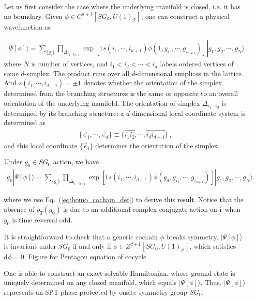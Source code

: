 \documentclass[%
 reprint,
 amsmath,amssymb,
 aps,pra,
]{revtex4-1}
\newcommand{\dd}{\mathrm{d}} %
\newcommand{\ii}{\mathrm{i}\,} %
\newcommand{\TT}{\mathcal{T}} %
\begin{document}
Let us first consider the case where the underlying manifold is closed, i.e. it has no boundary.
Given $\phi\in C^{d+1}[SG_0,U(1)_\TT]$, one can construct a physical wavefunction as
\begin{widetext}
\begin{align}
  |\Psi[\phi]\rangle=\sum_{\{g_i\}}\prod_{\Delta_{i_1\ldots i_{d+1}}}\exp\left[ \ii s(i_1,\cdots,i_{d+1})\phi(1,g_{i_1},\cdots,g_{i_{d+1}})\right]|g_1,g_2,\cdots,g_N\rangle
\label{eq:wf_from_cochain}
\end{align}
where $N$ is number of vertices, and $i_1<i_2<\cdots<i_d$ labels ordered vertices of some $d$-simplex.
The product runs over all $d$-dimensional simplices in the lattice.
And $s(i_1,\cdots,i_{d+1})=\pm1$ denotes whether the orientation of the simplex determined from the branching structures is the same or opposite to an overall orientation of the underlying manifold.
The orientation of simplex $\Delta_{i_1\ldots i_d}$ is determined by its branching structure: a $d$-dimensional local coordinate system is determined as
\begin{align}
  \{\vec{e}_1,\cdots,\vec{e}_d\}\equiv\{\overrightarrow{i_1i_2},\cdots,\overrightarrow{i_di_{d+1}}\}~,
  \label{eq:branch_local_coord}
\end{align}
and this local coordinate $\{\vec{e}_i\}$ determines the orientation of the simplex.

Under $g_0\in SG_0$ action, we have
\begin{align}
  g_0|\Psi[\phi]\rangle=\sum_{\{g_i\}}\prod_{\Delta_{i_1\ldots i_{d+1}}}\exp\left[ \ii s(i_1,\cdots,i_{d+1})\phi(g_0,g_{i_1},\cdots,g_{i_{d+1}})\right]|g_1,g_2,\cdots,g_N\rangle
\label{eq:sym_action_wf_from_cochain}
\end{align}
\end{widetext}
where we use Eq.~(\ref{eq:homo_cochain_def}) to derive this result.
Notice that the absence of $\rho_T(g_0)$ is due to an additional complex conjugate action on $\ii$ when $g_0$ is time reversal odd.

It is straightforward to check that a generic cochain $\phi$ breaks symmetry. 
$|\Psi[\phi]\rangle$ is invariant under $SG_0$ if and only if $\phi\in Z^{d+1}[SG_0,U(1)_\TT]$, which satisfies $\dd\phi=0$. 
{\color{red} Figure for Pentagon equation of cocycle}

One is able to construct an exact solvable Hamiltonian, whose ground state is uniquely determined on any closed manifold, which equals $|\Psi[\phi]\rangle$.
Thus, $|\Psi[\phi]\rangle$ represents an SPT phase protected by onsite symmetry group $SG_0$.
\end{document}
